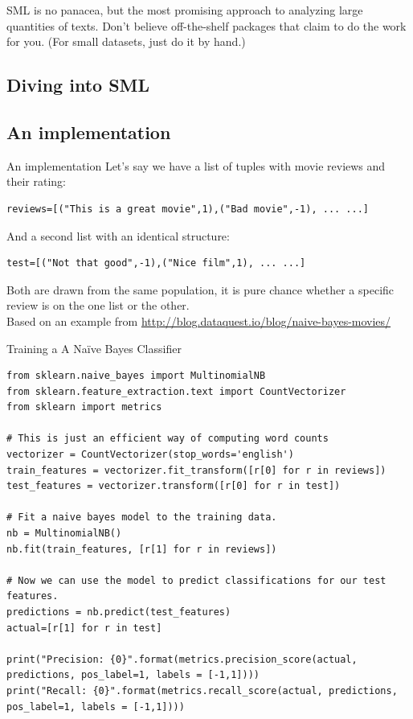 \begin{frame}[standout]
	SML is no panacea, but the most promising approach to analyzing large quantities of texts. Don't believe off-the-shelf packages that claim to do the work for you.
	(For small datasets, just do it by hand.)
\end{frame}




\subsection{Diving into SML}


\subsection{An implementation}

\begin{frame}[fragile]{An implementation}
	Let's say we have a list of tuples with movie reviews and their rating:
	\begin{lstlisting}
reviews=[("This is a great movie",1),("Bad movie",-1), ... ...]
	\end{lstlisting}
	And a second list with an identical structure:
	\begin{lstlisting}
test=[("Not that good",-1),("Nice film",1), ... ...]
	\end{lstlisting}
Both are drawn from the same population, it is pure chance whether a specific review is on the one list or the other.\\
\tiny{Based on an example from \url{http://blog.dataquest.io/blog/naive-bayes-movies/}}
\end{frame}


\begin{frame}[fragile]{Training a A Naïve Bayes Classifier}
	\begin{verbatim}
from sklearn.naive_bayes import MultinomialNB
from sklearn.feature_extraction.text import CountVectorizer
from sklearn import metrics
		
# This is just an efficient way of computing word counts
vectorizer = CountVectorizer(stop_words='english')
train_features = vectorizer.fit_transform([r[0] for r in reviews])
test_features = vectorizer.transform([r[0] for r in test])
		
# Fit a naive bayes model to the training data.
nb = MultinomialNB()
nb.fit(train_features, [r[1] for r in reviews])
		
# Now we can use the model to predict classifications for our test features.
predictions = nb.predict(test_features)
actual=[r[1] for r in test]
		
print("Precision: {0}".format(metrics.precision_score(actual, predictions, pos_label=1, labels = [-1,1])))
print("Recall: {0}".format(metrics.recall_score(actual, predictions, pos_label=1, labels = [-1,1])))
	\end{verbatim}
\end{frame}


